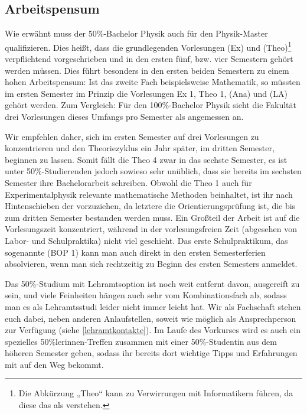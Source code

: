 \subsection{Arbeitspensum}
Wie erwähnt muss der 50\%-Bachelor Physik auch für den Physik-Master qualifizieren. Dies heißt, dass die grundlegenden Vorlesungen  (\gls{Ex}) und  (\gls{Theo})\footnote{Die Abkürzung „Theo“ kann zu Verwirrungen mit Informatikern führen, da diese das als  verstehen.} verpflichtend vorgeschrieben und in den ersten fünf, bzw. vier Semestern gehört werden müssen. Dies führt besonders in den ersten beiden Semestern zu einem hohen Arbeitspensum: Ist das zweite Fach beispielsweise Mathematik, so müssten im ersten Semester im Prinzip die Vorlesungen \gls{Ex} 1, \gls{Theo} 1,  (\gls{Ana}) und  (\gls{LA}) gehört werden. Zum Vergleich: Für den 100\%-Bachelor Physik sieht die Fakultät drei Vorlesungen dieses Umfangs pro Semester als angemessen an.

Wir empfehlen daher, sich im ersten Semester auf drei Vorlesungen zu konzentrieren und \zB den Theoriezyklus ein Jahr später, im dritten Semester, beginnen zu lassen. Somit fällt die \gls{Theo} 4 zwar in das sechste Semester, es ist unter 50\%-Studierenden jedoch sowieso sehr unüblich, dass sie bereits im sechsten Semester ihre Bachelorarbeit schreiben. Obwohl die \gls{Theo} 1 auch für Experimentalphysik relevante mathematische Methoden beinhaltet, ist ihr nach Hintenschieben der  vorzuziehen, da letztere die Orientierungsprüfung ist, die bis zum dritten Semester bestanden werden muss. Ein Großteil der Arbeit ist auf die Vorlesungszeit konzentriert, während in der vorlesungsfreien Zeit (abgesehen von Labor- und Schulpraktika) nicht viel geschieht. Das erste Schulpraktikum, das sogenannte  (BOP 1) kann man auch direkt in den ersten Semesterferien absolvieren, wenn man sich rechtzeitig zu Beginn des ersten Semesters anmeldet.

Das 50\%-Studium mit Lehramtsoption ist noch weit entfernt davon, ausgereift zu sein, und viele Feinheiten hängen auch sehr vom Kombinationsfach ab, sodass man es als Lehramtsstudi leider nicht immer leicht hat. Wir als Fachschaft stehen euch dabei, neben anderen Anlaufstellen, soweit wie möglich als Ansprechperson zur Verfügung (siehe \autoref{lehramtkontakte}). Im Laufe des Vorkurses wird es auch ein spezielles 50\%lerinnen-Treffen zusammen mit einer 50\%-Studentin aus dem höheren Semester geben, sodass ihr bereits dort wichtige Tipps und Erfahrungen mit auf den Weg bekommt.

